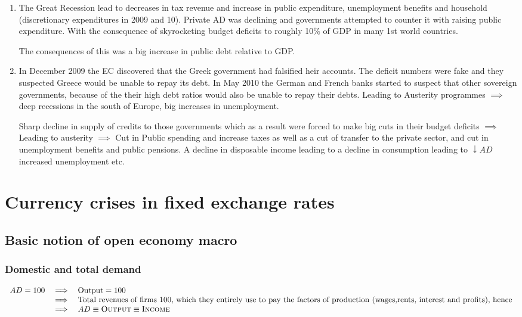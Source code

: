 \documentclass{report}
\begin{document}
\begin{enumerate}
    \item  The Great Recession lead to decreases in tax revenue and increase in public expenditure, unemployment benefits and household (discretionary expenditures in 2009 and 10). Private AD was declining and governments attempted to counter it with raising public expenditure. With the consequence of skyrocketing budget deficits to roughly 10\% of GDP in many 1st world countries.
    
    The consequences of this was a big increase in public debt relative to GDP. 
    
    \item In December 2009 the EC discovered that the Greek government had falsified heir accounts. The deficit numbers were fake and they suspected Greece would be unable to repay its debt. In May 2010 the German and French banks started to suspect that other sovereign governments, because of the their high debt ratios would also be unable to repay their debts. Leading to Austerity programmes $\implies$ deep recessions in the south of Europe, big increases in unemployment. 

Sharp decline in supply of credits to those governments  which as a result were forced to make big cuts in their budget deficits $\implies$ Leading to austerity $\implies$ Cut in Public spending and increase taxes as well as a cut of transfer to the private sector, and cut in unemployment benefits and public pensions. A decline in disposable income leading to a decline in consumption leading to $\downarrow AD$ increased unemployment etc.
\end{enumerate}

\chapter{Currency crises in fixed exchange rates}

\section{Basic notion of open economy macro}

\subsection{Domestic and total demand}

\begin{equation*}
\begin{array}{lcl}
AD = 100 & \implies & \text{Output} = 100 \\
& \implies & \text{Total revenues of firms 100, which they entirely use to pay the factors of production (wages,rents, interest and profits), hence} \\ & \implies & AD \equiv \text{\sc Output} \equiv \text{\sc Income} \end{array}
\end{equation*}
\end{document}
